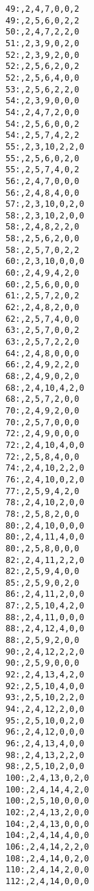 {\begin{verbatim}
49:,2,4,7,0,0,2
49:,2,5,6,0,2,2
50:,2,4,7,2,2,0
51:,2,3,9,0,2,0
52:,2,3,9,2,0,0
52:,2,5,6,2,0,2
52:,2,5,6,4,0,0
53:,2,5,6,2,2,0
54:,2,3,9,0,0,0
54:,2,4,7,2,0,0
54:,2,5,6,0,0,2
54:,2,5,7,4,2,2
55:,2,3,10,2,2,0
55:,2,5,6,0,2,0
55:,2,5,7,4,0,2
56:,2,4,7,0,0,0
56:,2,4,8,4,0,0
57:,2,3,10,0,2,0
58:,2,3,10,2,0,0
58:,2,4,8,2,2,0
58:,2,5,6,2,0,0
58:,2,5,7,0,2,2
60:,2,3,10,0,0,0
60:,2,4,9,4,2,0
60:,2,5,6,0,0,0
61:,2,5,7,2,0,2
62:,2,4,8,2,0,0
62:,2,5,7,4,0,0
63:,2,5,7,0,0,2
63:,2,5,7,2,2,0
64:,2,4,8,0,0,0
66:,2,4,9,2,2,0
68:,2,4,9,0,2,0
68:,2,4,10,4,2,0
68:,2,5,7,2,0,0
70:,2,4,9,2,0,0
70:,2,5,7,0,0,0
72:,2,4,9,0,0,0
72:,2,4,10,4,0,0
72:,2,5,8,4,0,0
74:,2,4,10,2,2,0
76:,2,4,10,0,2,0
77:,2,5,9,4,2,0
78:,2,4,10,2,0,0
78:,2,5,8,2,0,0
80:,2,4,10,0,0,0
80:,2,4,11,4,0,0
80:,2,5,8,0,0,0
82:,2,4,11,2,2,0
82:,2,5,9,4,0,0
85:,2,5,9,0,2,0
86:,2,4,11,2,0,0
87:,2,5,10,4,2,0
88:,2,4,11,0,0,0
88:,2,4,12,4,0,0
88:,2,5,9,2,0,0
90:,2,4,12,2,2,0
90:,2,5,9,0,0,0
92:,2,4,13,4,2,0
92:,2,5,10,4,0,0
93:,2,5,10,2,2,0
94:,2,4,12,2,0,0
95:,2,5,10,0,2,0
96:,2,4,12,0,0,0
96:,2,4,13,4,0,0
98:,2,4,13,2,2,0
98:,2,5,10,2,0,0
100:,2,4,13,0,2,0
100:,2,4,14,4,2,0
100:,2,5,10,0,0,0
102:,2,4,13,2,0,0
104:,2,4,13,0,0,0
104:,2,4,14,4,0,0
106:,2,4,14,2,2,0
108:,2,4,14,0,2,0
110:,2,4,14,2,0,0
112:,2,4,14,0,0,0
\end{verbatim}

}
